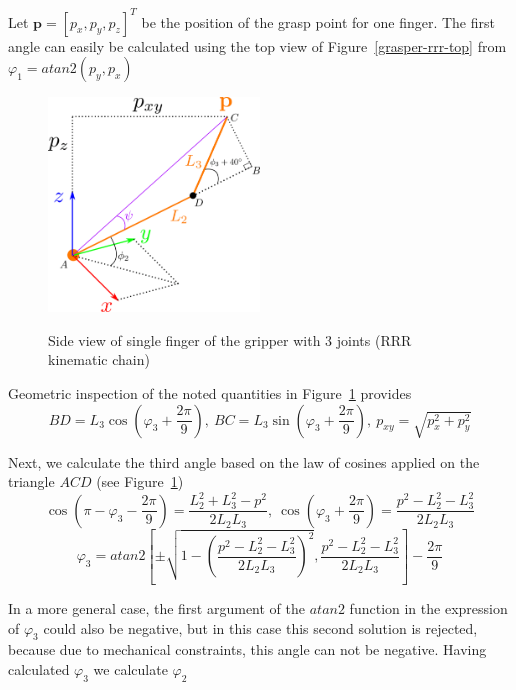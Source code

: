 Let 
$
\mathbf{p} = \left[p_x, p_y, p_z \right]^T
$
be the position of the grasp point for one finger. The first angle can easily be calculated using the top view of Figure~\ref{grasper-rrr-top} from $φ_1 = atan2 \left( p_y, p_x \right)$
\begin{center}
\begin{figure}[htbp]
\centering
\includegraphics[width=0.5\textwidth]{images/grasper-rrr-side.png}\\
\caption{Side view of single finger of the gripper with 3 joints (RRR kinematic chain)}
\label{grasper-rrr-side}
\end{figure}
\end{center}

Geometric inspection of the noted quantities in Figure~\ref{grasper-rrr-side} provides
\begin{equation}
BD = L_3 \cos \left(φ_3 + \frac{2π}{9} \right)
,~
BC = L_3 \sin \left(φ_3 + \frac{2π}{9} \right)
,~
p_{xy} = \sqrt{p_x^2 + p_y^2}
\end{equation}

Next, we calculate the third angle based on the law of cosines applied on the triangle $ACD$ (see Figure~\ref{grasper-rrr-side})
\begin{equation}
\cos \left( π - φ_3 - \frac{2π}{9} \right) = \frac{L_2^2 + L_3^2 - p^2}{2 L_2 L_3}
,~
\cos \left(φ_3 + \frac{2π}{9} \right) = \frac{p^2 - L_2^2 - L_3^2}{2 L_2 L_3}
\end{equation}
\begin{equation}
φ_3 = atan2 \left[ \pm \sqrt{1 - \left( \frac{p^2 - L_2^2 - L_3^2}{2 L_2 L_3} \right)^2} , \frac{p^2 - L_2^2 - L_3^2}{2 L_2 L_3} \right] - \frac{2π}{9}
\end{equation}

In a more general case, the first argument of the $atan2$ function in the expression of $φ_3$ could also be negative,
but in this case this second solution is rejected, because due to mechanical constraints, this angle can not be negative. 
Having calculated $φ_3$ we calculate $φ_2 $

